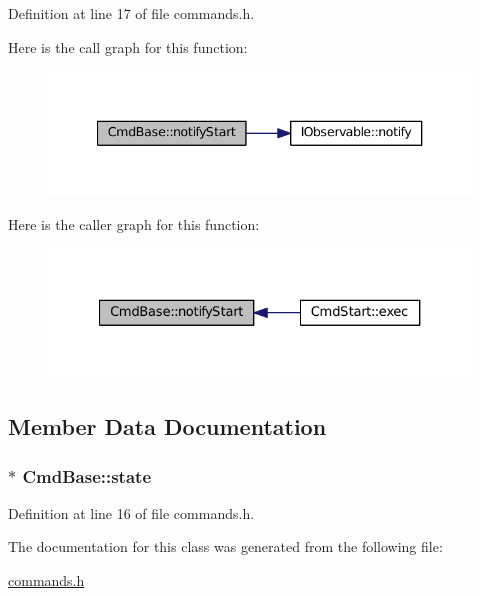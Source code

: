 Definition at line 17 of file commands.\+h.



Here is the call graph for this function\+:
\nopagebreak
\begin{figure}[H]
\begin{center}
\leavevmode
\includegraphics[width=340pt]{class_cmd_base_a090ff153849f8c18e2d0f1182ffa5acd_cgraph}
\end{center}
\end{figure}




Here is the caller graph for this function\+:
\nopagebreak
\begin{figure}[H]
\begin{center}
\leavevmode
\includegraphics[width=327pt]{class_cmd_base_a090ff153849f8c18e2d0f1182ffa5acd_icgraph}
\end{center}
\end{figure}




\subsection{Member Data Documentation}
\subsubsection[{\texorpdfstring{state}{state}}]{$\ast$ Cmd\+Base\+::state\hspace{0.3cm}{\ttfamily [protected]}}\hypertarget{class_cmd_base_a8960a4214ffcf20763e55b2eb3520a99}{}\label{class_cmd_base_a8960a4214ffcf20763e55b2eb3520a99}


Definition at line 16 of file commands.\+h.



The documentation for this class was generated from the following file\+:\begin{DoxyCompactItemize}
\item 
\hyperlink{commands_8h}{commands.\+h}\end{DoxyCompactItemize}
